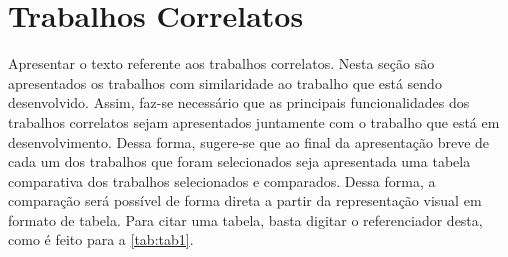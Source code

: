 \section{Trabalhos Correlatos}

Apresentar o texto referente aos trabalhos correlatos. Nesta seção são apresentados os trabalhos com similaridade ao trabalho que está sendo desenvolvido. Assim, faz-se necessário que as principais funcionalidades dos trabalhos correlatos sejam apresentados juntamente com o trabalho que está em desenvolvimento. Dessa forma, sugere-se que ao final da apresentação breve de cada um dos trabalhos que foram selecionados seja apresentada uma tabela comparativa dos trabalhos selecionados e comparados. Dessa forma, a comparação será possível de forma direta a partir da representação visual em formato de tabela. Para citar uma tabela, basta digitar o referenciador desta, como é feito para a \autoref{tab:tab1}.

